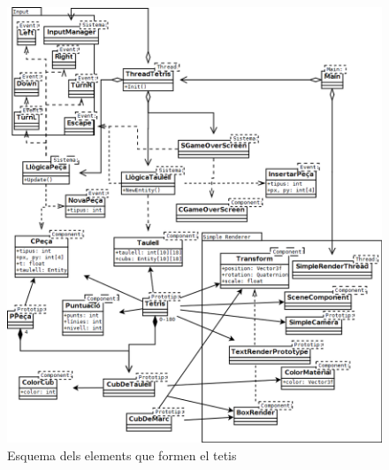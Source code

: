   \begin{figure}
    \includegraphics[width=1\linewidth]{./img/TetrisEntitats.png}
    \caption{Esquema dels elements que formen el tetis \label{fig:TetrisEntitats}}
  \end{figure}


